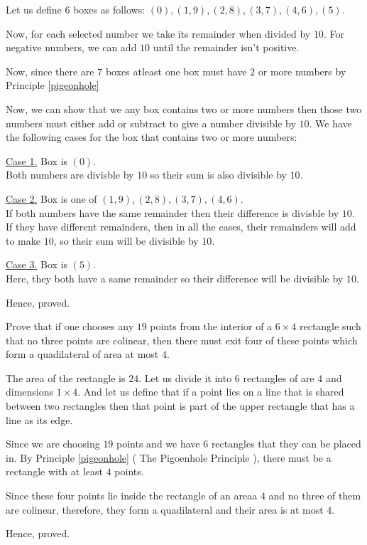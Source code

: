 \begin{solution}
	Let us define $6$ boxes as follows: $(0), (1,9), (2,8), (3,7), (4,6), (5)$.

	Now, for each selected number we take its remainder when divided by $10$.
	For negative numbers, we can add $10$ until the remainder isn't positive.

	Now, since there are $7$ boxes atleast one box must have $2$ or more numbers by Principle \ref{pigeonhole}

	Now, we can show that we any box contains two or more numbers then those two numbers must either add or subtract to give a number divisible by $10$. We have the following cases for the box that contains two or more numbers:

	\underline{Case 1.} Box is $(0)$. \\
	Both numbers are divisble by $10$ so their sum is also divisible by $10$.

	\underline{Case 2.} Box is one of $(1,9),(2,8),(3,7),(4,6)$. \\
	If both numbers have the same remainder then their difference is divisble by $10$. \\
	If they have different remainders, then in all the cases, their remainders will add to make $10$, so their sum will be divisible by $10$.

	\underline{Case 3.} Box is $(5)$. \\
	Here, they both have a same remainder so their difference will be divisible by $10$.

	Hence, proved. 
\end{solution}

\begin{problem}
	Prove that if one chooses any $19$ points from the interior of a $6 \times 4$ rectangle such that no three points are colinear, then there must exit four of these points which form a quadilateral of area at most $4$.
\end{problem}

\begin{solution}
	The area of the rectangle is $24$. Let us divide it into $6$ rectangles of are $4$ and dimensions $1 \times 4$.
	And let us define that if a point lies on a line that is shared between two rectangles 
	then that point is part of the upper rectangle that has a line as its edge.

	Since we are choosing $19$ points and we have $6$ rectangles that they can be placed in.
	By Principle \ref{pigeonhole} ( The Pigoenhole Principle ), there must be a rectangle with at least $4$ points.

	Since these four points lie inside the rectangle of an areaa $4$ and no three of them are colinear, therefore, they form a quadilateral and their area is at most $4$. 

	Hence, proved.
\end{solution}

